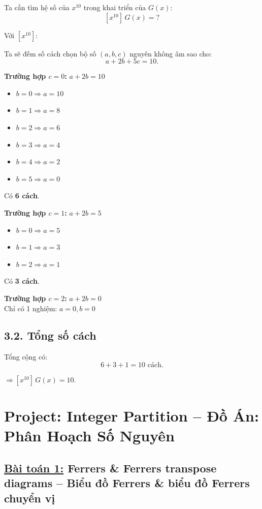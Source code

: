 \documentclass{article}
\begin{document}
	Ta cần tìm hệ số của $x^{10}$ trong khai triển của $G(x)$:
	\[
	[x^{10}]\,G(x) = ?
	\]
	
	Với $[x^{10}]$:
	
	Ta sẽ đếm số cách chọn bộ số \((a, b, c)\) nguyên không âm sao cho:
	\[
	a + 2b + 5c = 10.
	\]
	
	\noindent\textbf{Trường hợp \(c = 0\):} \(a + 2b = 10\)
	
	\begin{itemize}[leftmargin=1.5cm]
		\item \(b = 0 \Rightarrow a = 10\)
		\item \(b = 1 \Rightarrow a = 8\)
		\item \(b = 2 \Rightarrow a = 6\)
		\item \(b = 3 \Rightarrow a = 4\)
		\item \(b = 4 \Rightarrow a = 2\)
		\item \(b = 5 \Rightarrow a = 0\)
	\end{itemize}
	Có \textbf{6 cách}.
	
	\noindent\textbf{Trường hợp \(c = 1\):} \(a + 2b = 5\)
	
	\begin{itemize}[leftmargin=1.5cm]
		\item \(b = 0 \Rightarrow a = 5\)
		\item \(b = 1 \Rightarrow a = 3\)
		\item \(b = 2 \Rightarrow a = 1\)
	\end{itemize}
	Có \textbf{3 cách}.
	
	\noindent\textbf{Trường hợp \(c = 2\):} \(a + 2b = 0\) \\
	Chỉ có 1 nghiệm: \(a = 0, b = 0\)
	
	\subsection*{3.2. Tổng số cách}
	
	Tổng cộng có:
	\[
	6 + 3 + 1 = \boxed{10} \text{ cách}.
	\]
	
	$\Rightarrow [x^{10}]\,G(x) = 10.$
	
	\section*{Project: Integer Partition -- Đồ Án: Phân Hoạch Số Nguyên}
	
	\subsection*{\underline{Bài toán 1:} Ferrers \& Ferrers transpose diagrams -- Biểu đồ Ferrers \& biểu đồ Ferrers chuyển vị}
	
\end{document}
